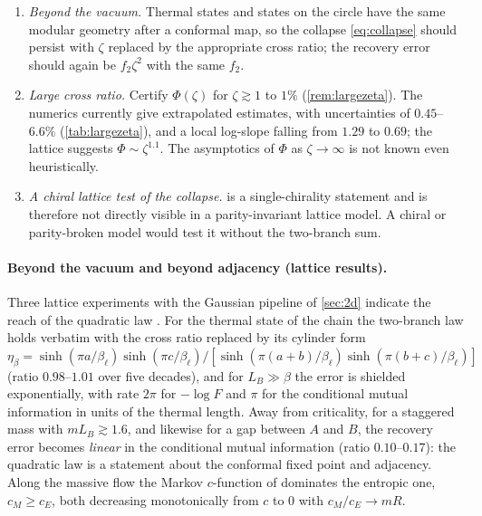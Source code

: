 \begin{enumerate}[label=(O\arabic*),leftmargin=2.6em]
invisible space (\cite{RigorE1}, Theorem~5.3).  The open question is the exact value
of the all-channel optimum, bracketed between the dual value and
$(1-\theta)f_2z^2\approx0.616\,f_2z^2$ (numerical estimate).
\item \emph{Beyond the vacuum.}  Thermal states and states on the circle have the
same modular geometry after a conformal map, so the collapse
\eqref{eq:collapse} should persist with $\zeta$ replaced by the appropriate cross
ratio; the recovery error should again be $f_2\zeta^2$ with the same $f_2$.
\item \emph{Large cross ratio.}  Certify $\Phi(\zeta)$ for $\zeta\gtrsim1$ to
$1\%$ (\cref{rem:largezeta}).  The numerics currently give extrapolated estimates, with uncertainties of
$0.45$--$6.6\%$ (\cref{tab:largezeta}), and a local log-slope falling from $1.29$ to
$0.69$; the lattice suggests
$\Phi\sim\zeta^{1.1}$.  The asymptotics of $\Phi$ as $\zeta\to\infty$ is not known
even heuristically.
\item \emph{A chiral lattice test of the collapse.}   is a
single-chirality statement and is therefore not directly visible in a
parity-invariant lattice model.  A chiral or parity-broken model would test it
without the two-branch sum.
\end{enumerate}

\paragraph{Beyond the vacuum and beyond adjacency (lattice results).}
Three lattice experiments with the Gaussian pipeline of \cref{sec:2d} indicate the reach of the quadratic law \cite{RigorS9}.  For the thermal state of the chain the two-branch law holds verbatim with the cross ratio replaced by its cylinder form $\eta_\beta=\sinh(\pi a/\beta_\ell)\sinh(\pi c/\beta_\ell)/[\sinh(\pi(a+b)/\beta_\ell)\sinh(\pi(b+c)/\beta_\ell)]$ (ratio $0.98$--$1.01$ over five decades), and for $L_B\gg\beta$ the error is shielded exponentially, with rate $2\pi$ for $-\log F$ and $\pi$ for the conditional mutual information in units of the thermal length.  Away from criticality, for a staggered mass with $mL_B\gtrsim1.6$, and likewise for a gap between $A$ and $B$, the recovery error becomes \emph{linear} in the conditional mutual information (ratio $0.10$--$0.17$): the quadratic law is a statement about the conformal fixed point and adjacency.  Along the massive flow the Markov $c$-function of \cite{Note3} dominates the entropic one, $c_M\ge c_E$, both decreasing monotonically from $c$ to $0$ with $c_M/c_E\to mR$.


